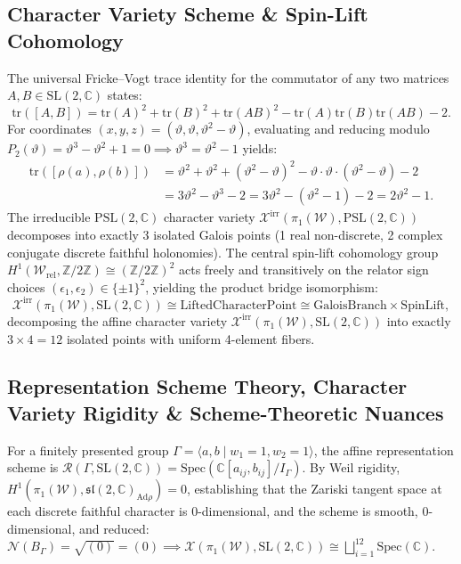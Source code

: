 \documentclass[11pt,a4paper]{article}
\begin{document}
\subsection{Character Variety Scheme \& Spin-Lift Cohomology}
The universal Fricke--Vogt trace identity for the commutator of any two matrices $A, B \in \mathrm{SL}(2, \mathbb{C})$ states:
\begin{equation}
\mathrm{tr}([A, B]) = \mathrm{tr}(A)^2 + \mathrm{tr}(B)^2 + \mathrm{tr}(AB)^2 - \mathrm{tr}(A)\mathrm{tr}(B)\mathrm{tr}(AB) - 2.
\end{equation}
For coordinates $(x, y, z) = (\vartheta, \vartheta, \vartheta^2 - \vartheta)$, evaluating and reducing modulo $P_2(\vartheta) = \vartheta^3 - \vartheta^2 + 1 = 0 \implies \vartheta^3 = \vartheta^2 - 1$ yields:
\begin{equation}
\begin{aligned}
\mathrm{tr}([\rho(a), \rho(b)]) &= \vartheta^2 + \vartheta^2 + (\vartheta^2 - \vartheta)^2 - \vartheta \cdot \vartheta \cdot (\vartheta^2 - \vartheta) - 2 \\
&= 3\vartheta^2 - \vartheta^3 - 2 = 3\vartheta^2 - (\vartheta^2 - 1) - 2 = 2\vartheta^2 - 1.
\end{aligned}
\end{equation}
The irreducible $\mathrm{PSL}(2, \mathbb{C})$ character variety $\mathcal{X}^{\mathrm{irr}}(\pi_1(\mathcal{W}), \mathrm{PSL}(2, \mathbb{C}))$ decomposes into exactly 3 isolated Galois points (1 real non-discrete, 2 complex conjugate discrete faithful holonomies). The central spin-lift cohomology group $H^1(\mathcal{W}_{\mathrm{rel}}, \mathbb{Z}/2\mathbb{Z}) \cong (\mathbb{Z}/2\mathbb{Z})^2$ acts freely and transitively on the relator sign choices $(\epsilon_1, \epsilon_2) \in \{\pm 1\}^2$, yielding the product bridge isomorphism:
\begin{equation}
\mathcal{X}^{\mathrm{irr}}(\pi_1(\mathcal{W}), \mathrm{SL}(2, \mathbb{C})) \cong \mathrm{LiftedCharacterPoint} \cong \mathrm{GaloisBranch} \times \mathrm{SpinLift},
\end{equation}
decomposing the affine character variety $\mathcal{X}^{\mathrm{irr}}(\pi_1(\mathcal{W}), \mathrm{SL}(2, \mathbb{C}))$ into exactly $3 \times 4 = 12$ isolated points with uniform 4-element fibers.

\subsection{Representation Scheme Theory, Character Variety Rigidity \& Scheme-Theoretic Nuances}
For a finitely presented group $\Gamma = \langle a, b \mid w_1 = 1, w_2 = 1 \rangle$, the affine representation scheme is $\mathcal{R}(\Gamma, \mathrm{SL}(2, \mathbb{C})) = \mathrm{Spec}(\mathbb{C}[a_{ij}, b_{ij}] / I_\Gamma)$. By Weil rigidity, $H^1(\pi_1(\mathcal{W}), \mathfrak{sl}(2, \mathbb{C})_{\mathrm{Ad}\rho}) = 0$, establishing that the Zariski tangent space at each discrete faithful character is 0-dimensional, and the scheme is smooth, 0-dimensional, and reduced: $\mathcal{N}(B_\Gamma) = \sqrt{(0)} = (0) \implies \mathcal{X}(\pi_1(\mathcal{W}), \mathrm{SL}(2, \mathbb{C})) \cong \bigsqcup_{i=1}^{12} \mathrm{Spec}(\mathbb{C})$.
\end{document}
